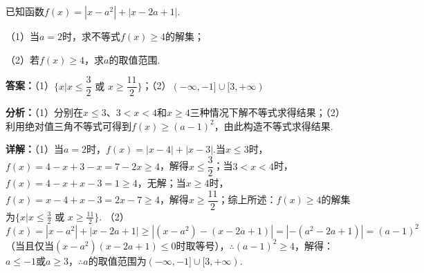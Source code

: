 \begin{question}[points=10]
已知函数$f(x)=|x-a^2|+|x-2a+1|$.

（1）当$a=2$时，求不等式$f(x)\ge4$的解集；

（2）若$f(x)\ge4$，求$a$的取值范围.
\begin{solution}
\textbf{答案：}（1）$\{x|x\le\dfrac32\text{ 或 }x\ge\dfrac{11}{2}\}$；（2）$(-\infty,-1]\cup[3,+\infty)$

\textbf{分析：}（1）分别在$x\le3$、$3<x<4$和$x\ge4$三种情况下解不等式求得结果；（2）利用绝对值三角不等式可得到$f(x)\ge(a-1)^2$，由此构造不等式求得结果.

\textbf{详解：}（1）当$a=2$时，$f(x)=|x-4|+|x-3|$.当$x\le3$时，$f(x)=4-x+3-x=7-2x\ge4$，解得$x\le\dfrac32$；当$3<x<4$时，$f(x)=4-x+x-3=1\ge4$，无解；当$x\ge4$时，$f(x)=x-4+x-3=2x-7\ge4$，解得$x\ge\dfrac{11}{2}$；综上所述：$f(x)\ge4$的解集为$\{x|x\le\frac32\text{ 或 }x\ge\frac{11}{2}\}$.
（2）$f(x)=|x-a^2|+|x-2a+1|\geq|(x-a^2)-(x-2a+1)|=|-(a^2-2a+1)|=(a-1)^2$（当且仅当$(x-a^2)(x-2a+1)\leq0$时取等号），$\therefore(a-1)^2\ge4$，解得：$a\le-1$或$a\ge3$，$\therefore a$的取值范围为$(-\infty,-1]\cup[3,+\infty)$.
\end{solution}
\end{question}

